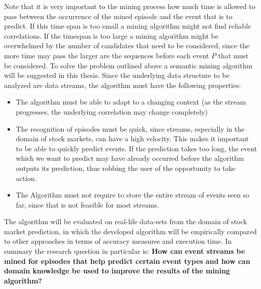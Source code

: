 Note that it is very important to the mining process how much time is allowed to pass between the occurrence of the mined episode and the event that is to predict. If this time span is too small a mining algorithm might not find reliable correlations. If the timespan is too large a mining algorithm might be overwhelmed by the number of candidates that need to be considered, since the more time may pass the larger are the sequences before each event $P$ that must be considered. %
\newline
To solve the problem outlined above a semantic mining algorithm will be suggested in this thesis. Since the underlying data structure to be analyzed are data streams, the algorithm must have the following properties:
\begin{itemize}
	\item The algorithm must be able to adapt to a changing context (as the stream progresses, the underlying correlation may change completely)
	\item The recognition of episodes must be quick, since streams, especially in the domain of stock markets, can have a high velocity. This makes it important to be able to quickly predict events. If the prediction takes too long, the event which we want to predict may have already occurred before the algorithm outputs its prediction, thus robbing the user of the opportunity to take action.
	\item The Algorithm must not require to store the entire stream of events seen so far, since that is not feasible for most streams.
\end{itemize}

The algorithm will be evaluated on real-life data-sets from the domain of stock market prediction, in which the developed algorithm will be empirically compared to other approaches in terms of accuracy measures and execution time. In summary the research question in particular is:\newline \newline
\textbf{How can event streams be mined for episodes that help predict certain event types and how can domain knowledge be used to improve the results of the mining algorithm?}